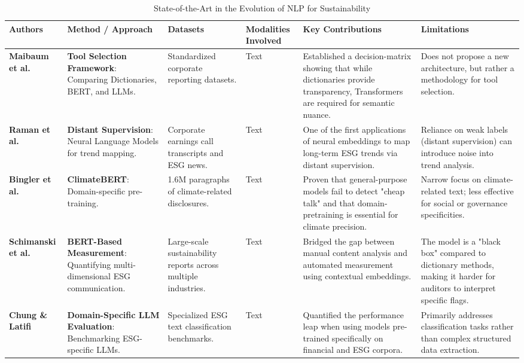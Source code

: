 \documentclass[english, online, cse, master]{dithesis}
\begin{document}
\begin{landscape}
\begin{table}[p]
\centering
\caption{State-of-the-Art in the Evolution of NLP for Sustainability}
\label{tab:nlp-evolution-sustainability-2}
\small
\renewcommand{\arraystretch}{1.2}
\begin{tabularx}{\linewidth}{|p{1.8cm}|p{3.5cm}|p{3cm}|p{1.8cm}|X|X|}
\hline
Authors & Method / Approach & Datasets & Modalities Involved & Key Contributions & Limitations \\ \hline
\textbf{Maibaum et al.}  \parencite{frederik_maibaum_b8629037} & \textbf{Tool Selection Framework}: Comparing Dictionaries, BERT, and LLMs. & Standardized corporate reporting datasets. & Text & Established a decision-matrix showing that while dictionaries provide transparency, Transformers are required for semantic nuance. & Does not propose a new architecture, but rather a methodology for tool selection. \\ \hline
\textbf{Raman et al.}  \parencite{natraj_raman_009776f2} & \textbf{Distant Supervision}: Neural Language Models for trend mapping. & Corporate earnings call transcripts and ESG news. & Text & One of the first applications of neural embeddings to map long-term ESG trends via distant supervision. & Reliance on weak labels (distant supervision) can introduce noise into trend analysis. \\ \hline
\textbf{Bingler et al.}  \parencite{julia_bingler_268445e3} & \textbf{ClimateBERT}: Domain-specific pre-training. & 1.6M paragraphs of climate-related disclosures. & Text & Proven that general-purpose models fail to detect "cheap talk" and that domain-pretraining is essential for climate precision. & Narrow focus on climate-related text; less effective for social or governance specificities. \\ \hline
\textbf{Schimanski et al.}  \parencite{tobias_schimanski_4e192ec5} & \textbf{BERT-Based Measurement}: Quantifying multi-dimensional ESG communication. & Large-scale sustainability reports across multiple industries. & Text & Bridged the gap between manual content analysis and automated measurement using contextual embeddings. & The model is a "black box" compared to dictionary methods, making it harder for auditors to interpret specific flags. \\ \hline
\textbf{Chung \& Latifi}  \parencite{tae_sun_chung_e16a4c18} & \textbf{Domain-Specific LLM Evaluation}: Benchmarking ESG-specific LLMs. & Specialized ESG text classification benchmarks. & Text & Quantified the performance leap when using models pre-trained specifically on financial and ESG corpora. & Primarily addresses classification tasks rather than complex structured data extraction. \\ \hline

\end{tabularx}
\end{table}
\end{landscape}
\end{document}
